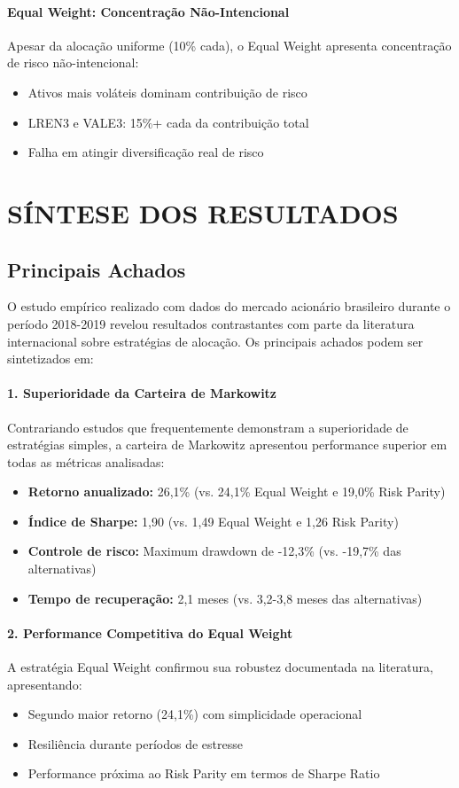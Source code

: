 \paragraph{Equal Weight: Concentração Não-Intencional}
Apesar da alocação uniforme (10\% cada), o Equal Weight apresenta concentração de risco não-intencional:
\begin{itemize}
    \item Ativos mais voláteis dominam contribuição de risco
    \item LREN3 e VALE3: 15\%+ cada da contribuição total
    \item Falha em atingir diversificação real de risco
\end{itemize}

\section{SÍNTESE DOS RESULTADOS}

\subsection{Principais Achados}

O estudo empírico realizado com dados do mercado acionário brasileiro durante o período 2018-2019 revelou resultados contrastantes com parte da literatura internacional sobre estratégias de alocação. Os principais achados podem ser sintetizados em:

\paragraph{1. Superioridade da Carteira de Markowitz}
Contrariando estudos que frequentemente demonstram a superioridade de estratégias simples, a carteira de Markowitz apresentou performance superior em todas as métricas analisadas:
\begin{itemize}
    \item \textbf{Retorno anualizado:} 26,1\% (vs. 24,1\% Equal Weight e 19,0\% Risk Parity)
    \item \textbf{Índice de Sharpe:} 1,90 (vs. 1,49 Equal Weight e 1,26 Risk Parity)
    \item \textbf{Controle de risco:} Maximum drawdown de -12,3\% (vs. -19,7\% das alternativas)
    \item \textbf{Tempo de recuperação:} 2,1 meses (vs. 3,2-3,8 meses das alternativas)
\end{itemize}

\paragraph{2. Performance Competitiva do Equal Weight}
A estratégia Equal Weight confirmou sua robustez documentada na literatura, apresentando:
\begin{itemize}
    \item Segundo maior retorno (24,1\%) com simplicidade operacional
    \item Resiliência durante períodos de estresse
    \item Performance próxima ao Risk Parity em termos de Sharpe Ratio
\end{itemize}

